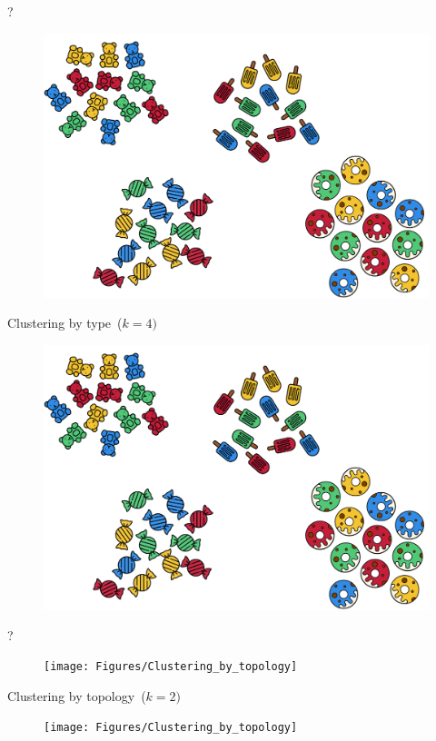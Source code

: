 \documentclass[aspectratio=169]{beamer}
\begin{document}
  \begin{frame}{?}
    \begin{figure}
      \includegraphics[width=0.75\linewidth]{Figures/Clustering_by_type}
    \end{figure}
  \end{frame}

  \begin{frame}{Clustering by type~($k = 4)$}
    \begin{figure}
      \includegraphics[width=0.75\linewidth]{Figures/Clustering_by_type}
    \end{figure}
  \end{frame}

  \begin{frame}{?}
    \begin{figure}
      \texttt{[image: Figures/Clustering\_by\_topology]}
    \end{figure}
  \end{frame}

  \begin{frame}{Clustering by topology~($k = 2)$}
    \begin{figure}
      \texttt{[image: Figures/Clustering\_by\_topology]}
    \end{figure}
  \end{frame}
\end{document}
